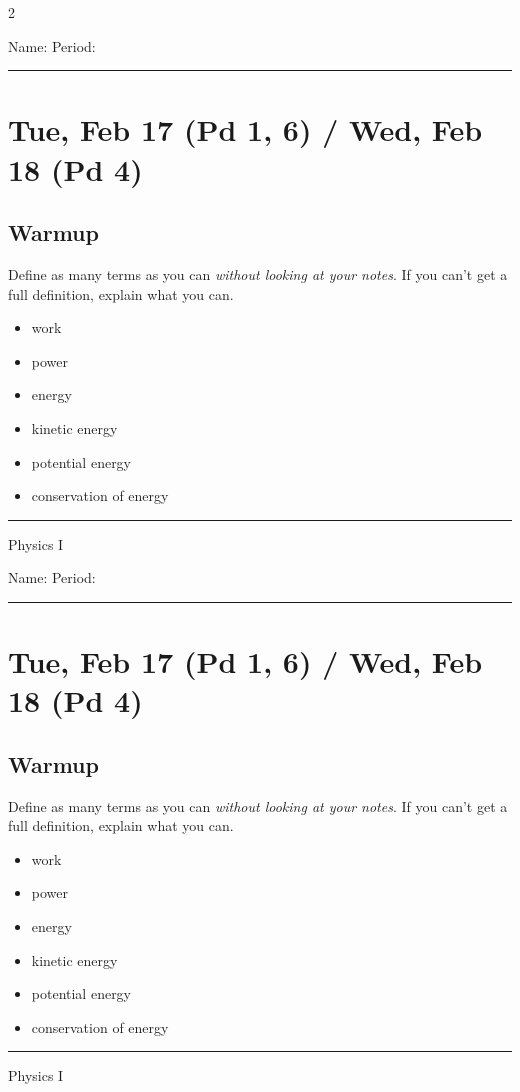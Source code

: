 \documentclass[10pt,landscape]{exam}
\def\todayDate{Tue, Feb 17 (Pd 1, 6) / Wed, Feb 18 (Pd 4)}
\def\content{
Define as many terms as you can \emph{without looking at your notes}.  If you can't get a full definition, explain what you can.

\begin{itemize}
    \item work \vs
    \item power \vs
    \item energy \vs
    \item kinetic energy \vs
    \item potential energy \vs
    \item conservation of energy \vs
\end{itemize}
}
\begin{document}
\pagestyle{empty}

\setlength{\columnsep}{0.8in}
\begin{multicols*}{2}

\noindent  
Name: \hfill Period: \hspace{5em}
\vspace{0.5em}
\hrule

\section*{\todayDate}
\subsection*{Warmup}

\content

\vfill
\hrule
\vspace{0.5em}
\hfill {\sc Physics I}

\columnbreak

\noindent  
Name: \hfill Period: \hspace{5em}
\vspace{0.5em}
\hrule

\section*{\todayDate}
\subsection*{Warmup}

\content

\vfill
\hrule
\vspace{0.5em}
\hfill {\sc Physics I}

\end{multicols*}
\end{document}
